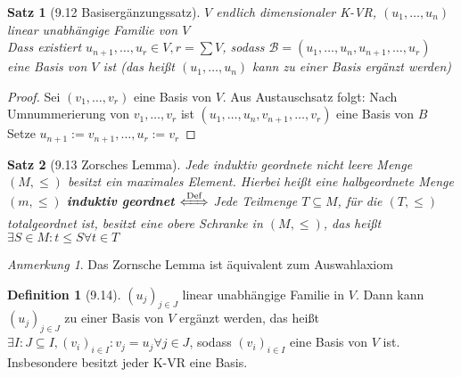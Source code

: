 \documentclass[a4paper]{scrartcl}
\DeclareMathOperator{\Exists}{\exists}
\DeclareMathOperator{\Forall}{\forall}
\theoremstyle{definition}
\newtheorem{defn}{Definition}
\theoremstyle{plain}
\newtheorem{thm}{Satz}
\theoremstyle{plain}
\theoremstyle{remark}
\theoremstyle{remark}
\newtheorem{note}{Anmerkung}
\theoremstyle{remark}
\theoremstyle{remark}
\theoremstyle{remark}
\begin{document}
\begin{thm}[9.12 Basisergänzungssatz]
$V$ endlich dimensionaler K-VR, $(u_1, \ldots, u_n)$ linear unabhängige Familie von $V$ \\
  Dass existiert $u_{n + 1}, \ldots, u_r \in V, r = \sum V$, sodass $\mathcal{B} = (u_1, \ldots, u_n, u_{n + 1}, \ldots, u_r)$ eine Basis von $V$ ist (das heißt $(u_1, \ldots, u_n)$ kann zu einer Basis ergänzt werden)
\end{thm}
\begin{proof}
Sei $(v_1, \ldots, v_r)$ eine Basis von $V$. Aus Austauschsatz folgt: Nach Umnummerierung von $v_1, \ldots, v_r$ ist $(u_1, \ldots, u_n,  v_{n + 1}, \ldots, v_r)$ eine Basis von $B$ Setze $u_{n + 1} := v_{n + 1}, \ldots, u_r := v_r$
\end{proof}
\begin{thm}[9.13 Zorsches Lemma]
Jede induktiv geordnete nicht leere Menge $(M, \leq)$ besitzt ein maximales Element.
Hierbei heißt eine halbgeordnete Menge $(m, \leq)$ \textbf{induktiv geordnet} $\xLeftrightarrow{\text{Def}}$ Jede Teilmenge $T\subseteq M$, für die $(T, \leq)$ totalgeordnet ist,
besitzt eine obere Schranke in $(M, \leq)$, das heißt $\Exists S\in M: t\leq S \Forall t\in T$
\end{thm}
\begin{note}
Das Zornsche Lemma ist äquivalent zum Auswahlaxiom
\end{note}
\begin{defn}[9.14]
$(u_j)_{j\in J}$ linear unabhängige Familie in $V$. Dann kann $(u_j)_{j \in J}$ zu einer
Basis von $V$ ergänzt werden, das heißt $\Exists I: J\subseteq I, (v_i)_{i\in I}: v_j = u_j \Forall j\in J$, sodass $(v_i)_{i\in I}$  eine Basis von $V$ ist.
Insbesondere besitzt jeder K-VR eine Basis.
\end{defn}
\end{document}
